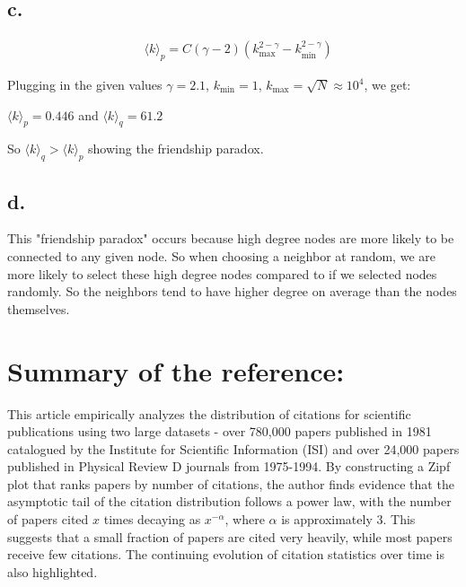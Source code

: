 \documentclass{article}
\begin{document}
\subsection*{c.}

\begin{align*} 
& \langle k \rangle_p = C (\gamma - 2) (k_{\max}^{2-\gamma} - k_{\min}^{2-\gamma}) 
\end{align*}

Plugging in the given values $\gamma = 2.1$, $k_{\min} = 1$, $k_{\max} = \sqrt{N} \approx 10^4$, we get:  

$\langle k \rangle_p = 0.446$   and     $\langle k \rangle_q = 61.2$

So $\langle k \rangle_q > \langle k \rangle_p$ showing the friendship paradox.

\subsection*{d.}

This "friendship paradox" occurs because high degree nodes are more likely to be connected to any given node. So when choosing a neighbor at random, we are more likely to select these high degree nodes compared to if we selected nodes randomly. So the neighbors tend to have higher degree on average than the nodes themselves.

\section*{Summary of the reference:}

This article empirically analyzes the distribution of citations for scientific publications using two large datasets - over 780,000 papers published in 1981 catalogued by the Institute for Scientific Information (ISI) and over 24,000 papers published in Physical Review D journals from 1975-1994. By constructing a Zipf plot that ranks papers by number of citations, the author finds evidence that the asymptotic tail of the citation distribution follows a power law, with the number of papers cited $x$ times decaying as $x^{-\alpha}$, where $\alpha$ is approximately 3. This suggests that a small fraction of papers are cited very heavily, while most papers receive few citations. The continuing evolution of citation statistics over time is also highlighted.
\end{document}
